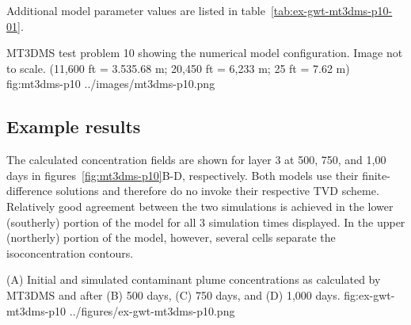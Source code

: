 Additional model parameter values are listed in table~\ref{tab:ex-gwt-mt3dms-p10-01}.  

\begin{StandardFigure}
	{MT3DMS test problem 10 showing the numerical model configuration.  Image not to scale. (11,600 ft = 3.535.68 m; 20,450 ft = 6,233 m; 25 ft = 7.62 m)} 
	{fig:mt3dms-p10}
	{../images/mt3dms-p10.png}
\end{StandardFigure}



\subsection{Example results}

The calculated concentration fields are shown for layer 3 at 500, 750, and 1,00 days in figures~\ref{fig:mt3dms-p10}B-D, respectively.  Both models use their finite-difference solutions and therefore do no invoke their respective TVD scheme.  Relatively good agreement between the two simulations is achieved in the lower (southerly) portion of the model for all 3 simulation times displayed.  In the upper (northerly) portion of the model, however, several cells separate the isoconcentration contours.

\begin{StandardFigure}
	{(A) Initial and simulated contaminant plume concentrations as calculated by MT3DMS and \mf after (B) 500 days, (C) 750 days, and (D) 1,000 days.} 
	{fig:ex-gwt-mt3dms-p10}
	{../figures/ex-gwt-mt3dms-p10.png}
\end{StandardFigure}
